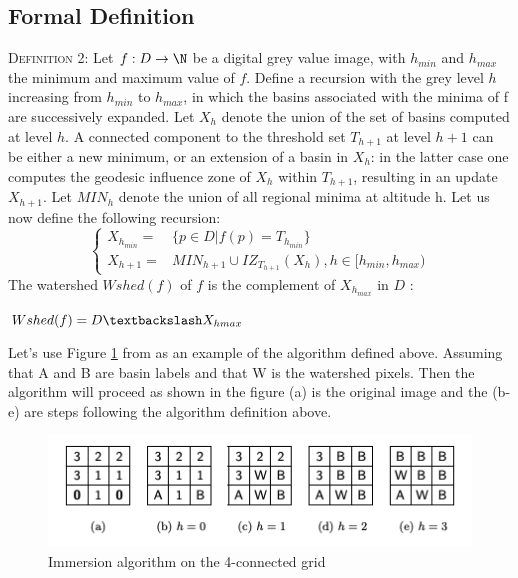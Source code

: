 \documentclass{article}
\begin{document}
\subsection{Formal Definition}
\begin{tcolorbox}
\textsc{Definition 2:} \cite{parwshed} \newline\newline
Let $f : D \to \N$ be a digital grey value image, with $h_{min}$ and $h_{max}$ the minimum and maximum value of $f$. Define a recursion with the grey level $h$ increasing from $h_{min}$ to $h_{max}$, in which the basins associated with the minima of f are successively expanded. Let $X_h$ denote the union of the set of basins computed at level $h$. A connected component to the threshold set $T_{h + 1}$ at level $h + 1$ can be either a new minimum, or an extension of a basin in $X_h$: in the latter case one computes the geodesic influence zone of $X_h$ within $T_{h+1}$, resulting in an update $X_{h+1}$. Let $MIN_h$ denote the union of all regional minima at altitude h.\newline\newline
Let us now define the following recursion: \newline
\[
\begin{cases}
    X_{h_{min}} = & \{p \in D | f(p) = T_{h_{min}}\}\\
    X_{h+1} = & MIN_{h+1} \cup IZ_{T_{h+1}}\left(X_h\right), h \in [h_{min}, h_{max})
\end{cases}
\]
\newline\newline
The watershed $Wshed(f)$ of $f$ is the complement of $X_{h_{max}}$ in $D$ : 
\begin{center}
    $Wshed(f) = D \textbackslash X_{h{max}}$
\end{center}
\end{tcolorbox}
\vspace{2mm}
\begin{flushleft}
Let's use Figure \ref{fig:example_1} from \cite{parwshed} as an example of the algorithm defined above. Assuming that A and B are basin labels and that W is the watershed pixels. Then the algorithm will proceed as shown in the figure (a) is the original image and the (b-e) are steps following the algorithm definition above.
\end{flushleft}

\begin{figure}[H]
    \centering
    \includegraphics[width=\linewidth]{example1.png}
    \caption{Immersion algorithm on the 4-connected grid}
    \label{fig:example_1}
\end{figure}
\end{document}
